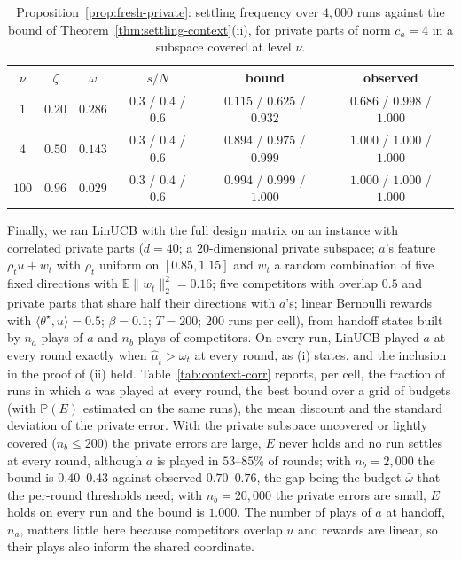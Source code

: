 \documentclass[anon]{alt2027} %
\newcommand{\Prb}{\mathbb{P}}
\newcommand{\E}{\mathbb{E}}
\begin{document}
\begin{table}[!htb]
\centering
\caption{Proposition~\ref{prop:fresh-private}: settling frequency over
$4{,}000$ runs against the bound of Theorem~\ref{thm:settling-context}(ii),
for private parts of norm $c_a=4$ in a subspace covered at level $\nu$.}
\label{tab:context-fresh}
\small
\begin{tabular}{@{}cccccc@{}}
\toprule
$\nu$ & $\zeta$ & $\bar\omega$ & $s/N$ & bound & observed\\
\midrule
$1$ & $0.20$ & $0.286$ & $0.3$ / $0.4$ / $0.6$ & $0.115$ / $0.625$ / $0.932$ & $0.686$ / $0.998$ / $1.000$\\
$4$ & $0.50$ & $0.143$ & $0.3$ / $0.4$ / $0.6$ & $0.894$ / $0.975$ / $0.999$ & $1.000$ / $1.000$ / $1.000$\\
$100$ & $0.96$ & $0.029$ & $0.3$ / $0.4$ / $0.6$ & $0.994$ / $0.999$ / $1.000$ & $1.000$ / $1.000$ / $1.000$\\
\bottomrule
\end{tabular}
\end{table}
Finally, we ran LinUCB with the full design matrix on an instance with
correlated private parts ($d=40$; a $20$-dimensional private subspace;
$a$'s feature $\rho_tu+w_t$ with $\rho_t$ uniform on $[0.85,1.15]$ and $w_t$
a random combination of five fixed directions with
$\E\|w_t\|_2^2=0.16$; five competitors with overlap $0.5$ and private parts
that share half their directions with $a$'s; linear Bernoulli rewards with
$\langle\theta^\star,u\rangle=0.5$; $\beta=0.1$; $T=200$; $200$ runs per
cell), from handoff states built by $n_a$ plays of $a$ and $n_b$ plays of
competitors. On every run, LinUCB played $a$ at every round exactly when
$\widehat\mu_t>\omega_t$ at every round, as (i) states, and the inclusion in
the proof of (ii) held. Table~\ref{tab:context-corr}
reports, per cell, the fraction of runs in which $a$ was played at every
round, the best bound over a grid of budgets (with $\Prb(E)$ estimated on the
same runs), the mean discount and the standard deviation of the private
error. With the private subspace uncovered or lightly covered
($n_b\le200$) the private errors are large, $E$ never holds and no run
settles at every round, although $a$ is played in $53$--$85\%$ of rounds;
with $n_b=2{,}000$ the bound is $0.40$--$0.43$ against observed
$0.70$--$0.76$, the gap being the budget $\bar\omega$ that the per-round
thresholds need; with $n_b=20{,}000$ the private errors are small, $E$
holds on every run and the bound is $1.000$. The number of plays of $a$ at
handoff, $n_a$, matters little here because competitors overlap $u$ and
rewards are linear, so their plays also inform the shared coordinate.
\end{document}
